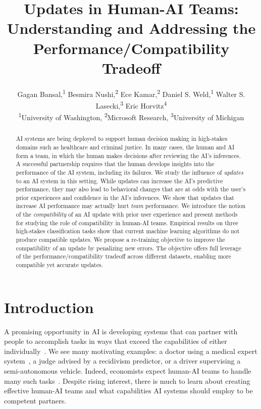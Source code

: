 \documentclass[letterpaper]{article} %
\title{Updates in Human-AI Teams:\\ Understanding and Addressing the Performance/Compatibility Tradeoff}
\author{
Gagan Bansal,\textsuperscript{\rm 1}
Besmira Nushi,\textsuperscript{\rm 2}
Ece Kamar,\textsuperscript{\rm 2}
Daniel S. Weld,\textsuperscript{\rm 1}
Walter S. Lasecki,\textsuperscript{\rm 3}
Eric Horvitz\textsuperscript{\rm 4}\\
\textsuperscript{\rm 1}University of Washington,
\textsuperscript{\rm 2}Microsoft Research,
\textsuperscript{\rm 3}University of Michigan
}
\newcommand{\?}{\mbox{?}}
\begin{document}
\maketitle
\begin{abstract}

AI systems are being deployed to support human decision making in high-stakes domains such as healthcare and criminal justice. In many cases, the human and AI form a team, in which the human makes decisions after reviewing the AI's inferences. A successful partnership requires that the human develops insights into the performance of the AI system, including its failures. We study the influence of {\em updates} to an AI system in this setting. While updates can increase the AI's predictive performance, they may also lead to behavioral changes that are at odds with the user's prior experiences and confidence in the AI's inferences. We show that updates that increase AI performance may actually hurt {\em team} performance. 
We introduce the notion of the {\em compatibility} of an AI update with prior user experience and present methods for studying the role of compatibility in human-AI teams. 
Empirical results on three high-stakes classification tasks show that current machine learning algorithms do not produce compatible updates. We propose a re-training objective to improve the compatibility of an update by penalizing new errors. The objective offers full leverage of the performance/compatibility tradeoff across different datasets, enabling more compatible yet accurate updates.

\end{abstract}


\maketitle


\section{Introduction}

A promising opportunity in AI is developing systems that can partner with people to accomplish tasks in ways that exceed the capabilities of either individually~\cite{wang2016deep,kamar2016directions,gaur2016effects}.
We see many motivating examples: a doctor using a medical expert system~\cite{wang2016deep}, a judge advised by a recidivism predictor, or a driver supervising a semi-autonomous vehicle. Indeed, economists expect human-AI teams to handle many such tasks~\cite{forrester-17}. Despite rising interest, there is much to learn about creating effective human-AI teams and what capabilities AI systems should employ to be competent partners. 
\end{document}
